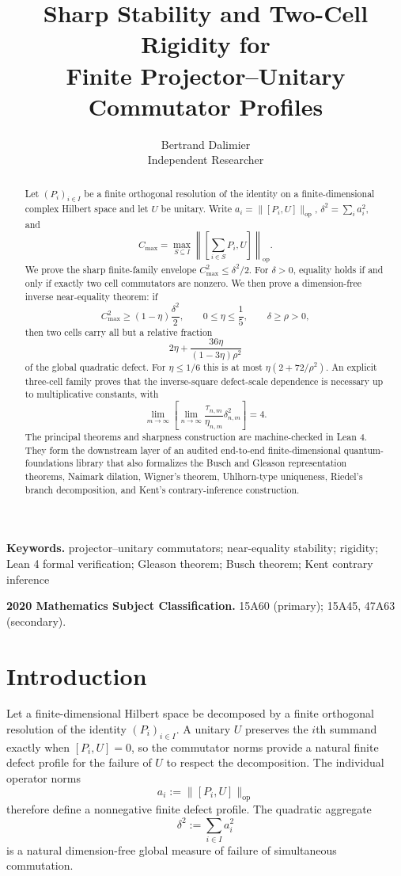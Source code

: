 \documentclass[11pt]{article}
\title{Sharp Stability and Two-Cell Rigidity for\\
Finite Projector--Unitary Commutator Profiles}
\author{Bertrand Dalimier\\
Independent Researcher}
\date{}
\newcommand{\op}{\mathrm{op}}
\newcommand{\cmax}{C_{\max}}
\newcommand{\dd}{\delta}
\newcommand{\etaq}{\eta}
\newcommand{\tauq}{\tau}
\begin{document}
\maketitle

\begin{abstract}
Let $(P_i)_{i\in I}$ be a finite orthogonal resolution of the identity on a
finite-dimensional complex Hilbert space and let $U$ be unitary.  Write
$a_i=\|[P_i,U]\|_{\op}$,
$\dd^2=\sum_i a_i^2$, and
\[
  \cmax=\max_{S\subseteq I}
  \left\|\left[\sum_{i\in S}P_i,U\right]\right\|_{\op}.
\]
We prove the sharp finite-family envelope
$\cmax^2\le\dd^2/2$.  For $\dd>0$, equality holds if and only if exactly two
cell commutators are nonzero.  We then prove a dimension-free inverse
near-equality theorem: if
\[
  \cmax^2\ge(1-\etaq)\frac{\dd^2}{2},
  \qquad
  0\le\etaq\le\frac15,
  \qquad
  \dd\ge\rho>0,
\]
then two cells carry all but a relative fraction
\[
  2\etaq+\frac{36\etaq}{(1-3\etaq)\rho^2}
\]
of the global quadratic defect.  For $\etaq\le1/6$ this is at most
$\etaq(2+72/\rho^2)$.  An explicit three-cell family proves that the
inverse-square defect-scale dependence is necessary up to multiplicative
constants, with
\[
  \lim_{m\to\infty}\left[
    \lim_{n\to\infty}
    \frac{\tauq_{n,m}}{\etaq_{n,m}}\dd_{n,m}^2
  \right]=4.
\]
The principal theorems and sharpness construction are machine-checked in
Lean 4.  They form the downstream layer of an audited end-to-end
finite-dimensional quantum-foundations library that also formalizes the
Busch and Gleason representation theorems, Naimark dilation, Wigner's theorem,
Uhlhorn-type uniqueness, Riedel's branch decomposition, and Kent's
contrary-inference construction.
\end{abstract}

\noindent\textbf{Keywords.}
projector--unitary commutators; near-equality stability; rigidity;
Lean 4 formal verification; Gleason theorem; Busch theorem;
Kent contrary inference

\noindent\textbf{2020 Mathematics Subject Classification.}
15A60 (primary); 15A45, 47A63 (secondary).

\section{Introduction}

Let a finite-dimensional Hilbert space be decomposed by a finite orthogonal
resolution of the identity $(P_i)_{i\in I}$.  A unitary $U$ preserves the
$i$th summand exactly when $[P_i,U]=0$, so the commutator norms provide a
natural finite defect profile for the failure of $U$ to respect the
decomposition.  The individual operator norms
\[
  a_i:=\|[P_i,U]\|_{\op}
\]
therefore define a nonnegative finite defect profile.  The quadratic aggregate
\[
  \dd^2:=\sum_{i\in I} a_i^2
\]
is a natural dimension-free global measure of failure of simultaneous
commutation.
\end{document}
